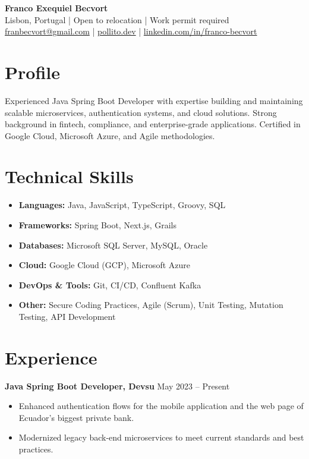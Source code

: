 \documentclass[10pt, letterpaper]{article}
\begin{document}
\begin{center}
    {\LARGE\bfseries Franco Exequiel Becvort} \\
    Lisbon, Portugal | Open to relocation | Work permit required \\
    \href{mailto:franbecvort@gmail.com}{franbecvort@gmail.com} | 
    \href{https://pollito.dev/}{pollito.dev} | 
    \href{https://linkedin.com/in/franco-becvort}{linkedin.com/in/franco-becvort} \\
\end{center}

\vspace{5pt}

\section{Profile}
Experienced Java Spring Boot Developer with expertise  building and maintaining scalable microservices, authentication systems, and cloud solutions. Strong background in fintech, compliance, and enterprise-grade applications. Certified in Google Cloud, Microsoft Azure, and Agile methodologies.

\section{Technical Skills}
\begin{itemize}[leftmargin=10pt, noitemsep]
    \item \textbf{Languages:} Java, JavaScript, TypeScript, Groovy, SQL
    \item \textbf{Frameworks:} Spring Boot, Next.js, Grails
    \item \textbf{Databases:} Microsoft SQL Server, MySQL, Oracle
    \item \textbf{Cloud:} Google Cloud (GCP), Microsoft Azure
    \item \textbf{DevOps \& Tools:} Git, CI/CD, Confluent Kafka
    \item \textbf{Other:} Secure Coding Practices, Agile (Scrum), Unit Testing, Mutation Testing, API Development
\end{itemize}

\section{Experience}
\textbf{Java Spring Boot Developer, Devsu} \hfill May 2023 – Present \
\begin{itemize}[leftmargin=10pt, noitemsep]
    \item Enhanced authentication flows for the mobile application and the web page of Ecuador's biggest private bank.
    \item Modernized legacy back-end microservices to meet current standards and best practices.
\end{itemize}
\end{document}
